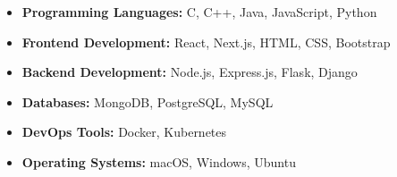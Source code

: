 
{\small
\begin{itemize}
  \item \textbf{Programming Languages:} C, C++, Java, JavaScript, Python
  \item \textbf{Frontend Development:} React, Next.js, HTML, CSS, Bootstrap
  \item \textbf{Backend Development:} Node.js, Express.js, Flask, Django
  \item \textbf{Databases:} MongoDB, PostgreSQL, MySQL
  \item \textbf{DevOps Tools:} Docker, Kubernetes
  \item \textbf{Operating Systems:} macOS, Windows, Ubuntu
\end{itemize}
}
